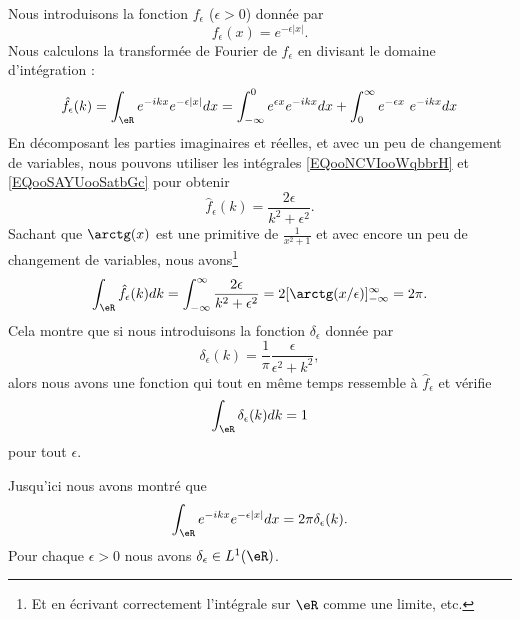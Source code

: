 \begin{example}
    Nous introduisons la fonction \( f_{\epsilon}\) (\( \epsilon>0\)) donnée par
    \begin{equation}
        f_{\epsilon}(x)= e^{-\epsilon| x |}.
    \end{equation}
    Nous calculons la transformée de Fourier de \( f_{\epsilon}\) en divisant le domaine d'intégration :
    \begin{equation}
        \hat f_{\epsilon}(k)=\int_{\eR} e^{-ikx} e^{-\epsilon| x |}dx=\int_{-\infty}^0 e^{\epsilon x} e^{-ikx}dx+\int_{0}^{\infty} e^{-\epsilon x}\ e^{-ikx}dx
    \end{equation}
    En décomposant les parties imaginaires et réelles, et avec un peu de changement de variables, nous pouvons utiliser les intégrales \eqref{EQooNCVIooWqbbrH} et \eqref{EQooSAYUooSatbGc} pour obtenir
    \begin{equation}
        \hat f_{\epsilon}(k)=\frac{ 2\epsilon }{ k^2+\epsilon^2 }.
    \end{equation}
    Sachant que \( \arctg(x)\) est une primitive de \( \frac{1}{ x^2+1 }\) et avec encore un peu de changement de variables, nous avons\footnote{Et en écrivant correctement l'intégrale sur \( \eR\) comme une limite, etc.}
    \begin{equation}
        \int_{\eR}\hat f_{\epsilon}(k)dk=\int_{-\infty}^{\infty}\frac{ 2\epsilon }{ k^2+\epsilon^2 }=2[\arctg(x/\epsilon)]_{-\infty}^{\infty}=2\pi.
    \end{equation}
    Cela montre que si nous introduisons la fonction \( \delta_{\epsilon}\) donnée par
    \begin{equation}
        \delta_{\epsilon}(k)=\frac{1}{ \pi }\frac{ \epsilon }{ \epsilon^2+k^2 },
    \end{equation}
    alors nous avons une fonction qui tout en même temps ressemble à \( \hat f_{\epsilon}\) et vérifie
    \begin{equation}
        \int_{\eR}\delta_{\epsilon}(k)dk=1
    \end{equation}
    pour tout \( \epsilon\).

    Jusqu'ici nous avons montré que
    \begin{equation}        \label{EQooQOOOooBnfJNi}
        \int_{\eR} e^{-ikx} e^{-\epsilon| x |}dx=2\pi \delta_{\epsilon}(k).
    \end{equation}
    Pour chaque \( \epsilon>0\) nous avons \( \delta_{\epsilon}\in L^1(\eR)\).
\end{example}

